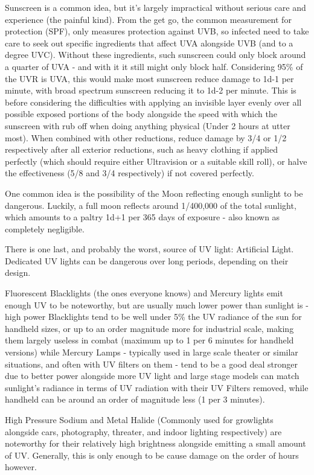 \begin{multicols*}{3}
	Sunscreen is a common idea, but it's largely impractical without serious care and experience (the painful kind). From the get go, the common measurement for protection (SPF), only measures protection against UVB, so infected need to take care to seek out specific ingredients that affect UVA alongside UVB (and to a degree UVC). Without these ingredients, such sunscreen could only block around a quarter of UVA - and with it it still might only block half. Considering 95\% of the UVR is UVA, this would make most sunscreen reduce damage to 1d-1 per minute, with broad spectrum sunscreen reducing it to 1d-2 per minute. This is before considering the difficulties with applying an invisible layer evenly over all possible exposed portions of the body alongside the speed with which the sunscreen with rub off when doing anything physical (Under 2 hours at utter most). When combined with other reductions, reduce damage by 3/4 or 1/2 respectively after all exterior reductions, such as heavy clothing if applied perfectly (which should require either Ultravision or a suitable skill roll), or halve the effectiveness (5/8 and 3/4 respectively) if not covered perfectly.
			
	One common idea is the possibility of the Moon reflecting enough sunlight to be dangerous. Luckily, a full moon reflects around 1/400,000 of the total sunlight, which amounts to a paltry 1d+1 per 365 days of exposure - also known as completely negligible.
	
	There is one last, and probably the worst, source of UV light: Artificial Light. Dedicated UV lights can be dangerous over long periods, depending on their design. 
	
	Fluorescent Blacklights (the ones everyone knows) and Mercury lights emit enough UV to be noteworthy, but are usually much lower power than sunlight is - high power Blacklights tend to be well under 5\% the UV radiance of the sun for handheld sizes, or up to an order magnitude more for industrial scale, making them largely useless in combat (maximum up to 1 per 6 minutes for handheld versions) while Mercury Lamps - typically used in large scale theater or similar situations, and often with UV filters on them - tend to be a good deal stronger due to better power alongside more UV light and large stage models can match sunlight's radiance in terms of UV radiation with their UV Filters removed, while handheld can be around an order of magnitude less (1 per 3 minutes).
	
	High Pressure Sodium and Metal Halide (Commonly used for growlights alongside cars, photography, threater, and indoor lighting respectively) are noteworthy for their relatively high brightness alongside emitting a small amount of UV. Generally, this is only enough to be cause damage on the order of hours however.
	

\end{multicols*}
